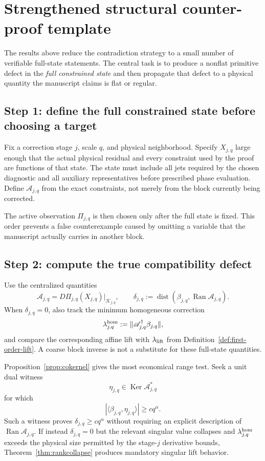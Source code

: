 \documentclass[12pt]{article}
\newcommand{\A}{\mathcal A}
\newcommand{\Ran}{\operatorname{Ran}}
\newcommand{\Ker}{\operatorname{Ker}}
\newcommand{\dist}{\operatorname{dist}}
\newcommand{\Kt}{\mathcal K}
\newcommand{\Comp}{\mathscr A}
\begin{document}
\section{Strengthened structural counter-proof template}
The results above reduce the contradiction strategy to a small number of verifiable full-state statements. The central task is to produce a nonflat primitive defect in the \emph{full constrained state} and then propagate that defect to a physical quantity the manuscript claims is flat or regular.

\subsection{Step 1: define the full constrained state before choosing a target}
Fix a correction stage $j$, scale $q$, and physical neighborhood. Specify $X_{j,q}$ large enough that the actual physical residual and every constraint used by the proof are functions of that state. The state must include all jets required by the chosen diagnostic and all auxiliary representatives before prescribed phase evaluation. Define $\A_{j,q}$ from the exact constraints, not merely from the block currently being corrected.

The active observation $\Pi_{j,q}$ is then chosen only after the full state is fixed. This order prevents a false counterexample caused by omitting a variable that the manuscript actually carries in another block.

\subsection{Step 2: compute the true compatibility defect}
Use the centralized quantities
\[
\Comp_{j,q}=D\Pi_{j,q}(X_{j,q})|_{\Kt_{j,q}},
\qquad
\delta_{j,q}:=\dist(\beta_{j,q},\Ran\Comp_{j,q}).
\]
When $\delta_{j,q}=0$, also track the minimum homogeneous correction
\[
\lambda^{\rm hom}_{j,q}:=\|\Comp_{j,q}^{\dagger}\beta_{j,q}\|,
\]
and compare the corresponding affine lift with $\lambda_{\rm lift}$ from Definition~\ref{def:first-order-lift}. A coarse block inverse is not a substitute for these full-state quantities.

Proposition~\ref{prop:cokernel} gives the most economical range test. Seek a unit dual witness
\[
\eta_{j,q}\in\Ker\Comp_{j,q}^*
\]
for which
\[
|\langle\beta_{j,q},\eta_{j,q}\rangle|
\ge c q^\alpha.
\]
Such a witness proves $\delta_{j,q}\ge cq^\alpha$ without requiring an explicit description of $\Ran\Comp_{j,q}$. If instead $\delta_{j,q}=0$ but the relevant singular value collapses and $\lambda^{\rm hom}_{j,q}$ exceeds the physical size permitted by the stage-$j$ derivative bounds, Theorem~\ref{thm:rankcollapse} produces mandatory singular lift behavior.
\end{document}
